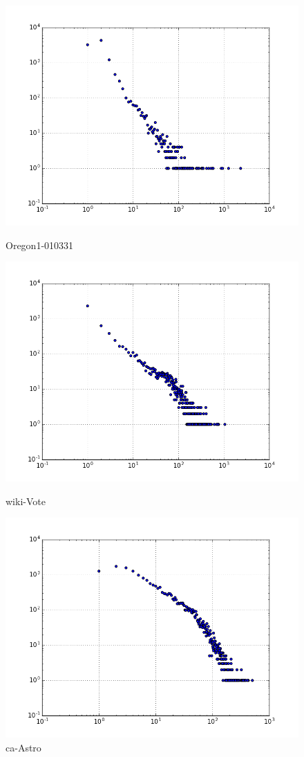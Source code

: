 \begin{figure}[H]
  \includegraphics[width=\linewidth]{img/oregon-010331/degree_dist.png}
  \caption*{Oregon1-010331}
\endminipage\hfill
{}
  \includegraphics[width=\linewidth]{img/wiki-Vote/degree_dist.png}
  \caption*{wiki-Vote}
\endminipage\hfill
{}
  \includegraphics[width=\linewidth]{img/ca-Astro/degree_dist.png}
  \caption*{ca-Astro}
\endminipage
\end{figure}


